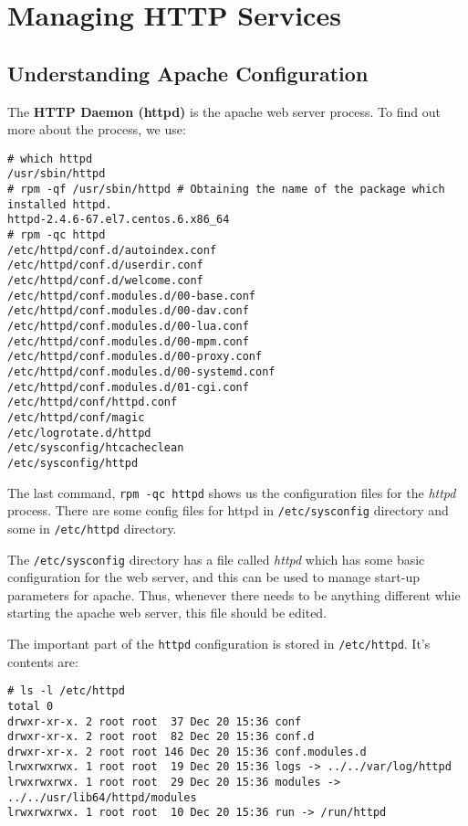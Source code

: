 \chapter{Managing HTTP Services}

\section{Understanding Apache Configuration}
The \textbf{HTTP Daemon (httpd)} is the apache web server process. To find out more about the process, we use:

\vspace{-15pt}
\begin{verbatim}
# which httpd
/usr/sbin/httpd
# rpm -qf /usr/sbin/httpd # Obtaining the name of the package which installed httpd.
httpd-2.4.6-67.el7.centos.6.x86_64
# rpm -qc httpd
/etc/httpd/conf.d/autoindex.conf
/etc/httpd/conf.d/userdir.conf
/etc/httpd/conf.d/welcome.conf
/etc/httpd/conf.modules.d/00-base.conf
/etc/httpd/conf.modules.d/00-dav.conf
/etc/httpd/conf.modules.d/00-lua.conf
/etc/httpd/conf.modules.d/00-mpm.conf
/etc/httpd/conf.modules.d/00-proxy.conf
/etc/httpd/conf.modules.d/00-systemd.conf
/etc/httpd/conf.modules.d/01-cgi.conf
/etc/httpd/conf/httpd.conf
/etc/httpd/conf/magic
/etc/logrotate.d/httpd
/etc/sysconfig/htcacheclean
/etc/sysconfig/httpd
\end{verbatim}
\vspace{-10pt}

\noindent
The last command, \verb|rpm -qc httpd| shows us the configuration files for the \textit{httpd} process. There are some config files for httpd in \verb|/etc/sysconfig| directory and some in \verb|/etc/httpd| directory. 

The \verb|/etc/sysconfig| directory has a file called \textit{httpd} which has some basic configuration for the web server, and this can be used to manage start-up parameters for apache. Thus, whenever there needs to be anything different whie starting the apache web server, this file should be edited. 

The important part of the \verb|httpd| configuration is stored in \verb|/etc/httpd|. It's contents are:

\vspace{-15pt}
\begin{verbatim}
# ls -l /etc/httpd
total 0
drwxr-xr-x. 2 root root  37 Dec 20 15:36 conf
drwxr-xr-x. 2 root root  82 Dec 20 15:36 conf.d
drwxr-xr-x. 2 root root 146 Dec 20 15:36 conf.modules.d
lrwxrwxrwx. 1 root root  19 Dec 20 15:36 logs -> ../../var/log/httpd
lrwxrwxrwx. 1 root root  29 Dec 20 15:36 modules -> ../../usr/lib64/httpd/modules
lrwxrwxrwx. 1 root root  10 Dec 20 15:36 run -> /run/httpd
\end{verbatim}
\vspace{-10pt}

